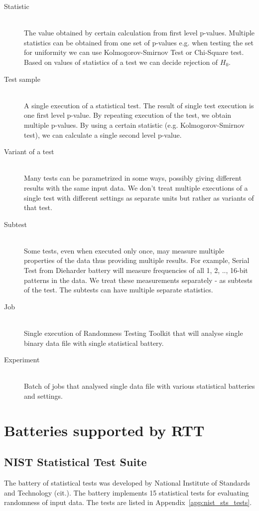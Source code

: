 \documentclass[
  digital,  	%
  color,		%
  oneside,   	%
  12pt,
  nocover,
  notable,
  nolof,
  nolot,
]{fithesis3}
\theoremstyle{definition}
\theoremstyle{remark}
\begin{document}
\begin{description}
\item[Statistic] \hfill \\
The value obtained by certain calculation from first level p-values. Multiple statistics can be obtained from one set of p-values e.g. when testing the set for uniformity we can use Kolmogorov-Smirnov Test or Chi-Square test. Based on values of statistics of a test we can decide rejection of $H_0$.

\item[Test sample] \hfill \\
A single execution of a statistical test. The result of single test execution is one first level p-value. By repeating execution of the test, we obtain multiple p-values. By using a certain statistic (e.g. Kolmogorov-Smirnov test), we can calculate a single second level p-value.

\item[Variant of a test] \hfill \\
Many tests can be parametrized in some ways, possibly giving different results with the same input data. We don't treat multiple executions of a single test with different settings as separate units but rather as variants of that test.

\item[Subtest] \hfill \\
Some tests, even when executed only once, may measure multiple properties of the data thus providing multiple results. For example, Serial Test from Dieharder battery will measure frequencies of all 1, 2, .., 16-bit patterns in the data. We treat these measurements separately - as subtests of the test. The subtests can have multiple separate statistics.

\item[Job] \hfill \\
Single execution of Randomness Testing Toolkit that will analyse single binary data file with single statistical battery.

\item[Experiment] \hfill \\
Batch of jobs that analysed single data file with various statistical batteries and settings.

\end{description}

\section{Batteries supported by RTT}
\subsection{NIST Statistical Test Suite}
The battery of statistical tests was developed by National Institute of Standards and Technology (cit.). The battery implements 15 statistical tests for evaluating randomness of input data. The tests are listed in Appendix~\ref{app:nist_sts_tests}.
\end{document}
